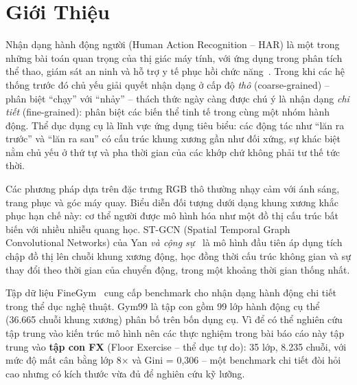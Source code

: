 \documentclass[conference]{IEEEtran}
\begin{document}
\section{Giới Thiệu}
\label{sec:intro}

Nhận dạng hành động người (Human Action Recognition -- HAR) là một trong
những bài toán quan trọng của thị giác máy tính, với ứng dụng trong phân
tích thể thao, giám sát an ninh và hỗ trợ y tế phục hồi chức
năng~\cite{yan2018stgcn}. Trong khi các hệ thống trước đó chủ yếu giải quyết
nhận dạng ở cấp độ \textit{thô} (coarse-grained) -- phân biệt ``chạy''
với ``nhảy'' -- thách thức ngày càng được chú ý là nhận dạng \textit{chi tiết} (fine-grained): phân biệt các biến thể tinh tế trong cùng một nhóm
hành động. Thể dục dụng cụ là lĩnh vực ứng dụng tiêu biểu: các động tác như
``lăn ra trước'' và ``lăn ra sau'' có cấu trúc khung xương gần như đối
xứng, sự khác biệt nằm chủ yếu ở thứ tự và pha thời gian của các khớp
chứ không phải tư thế tức thời.

Các phương pháp dựa trên đặc trưng RGB thô thường nhạy cảm với ánh sáng, trang phục
và góc máy quay. Biểu diễn đối tượng dưới dạng khung xương khắc phục hạn chế này: cơ thể
người được mô hình hóa như một đồ thị cấu trúc bất biến với nhiều nhiễu
quang học. ST-GCN (Spatial Temporal Graph Convolutional Networks) của Yan
\textit{và cộng sự}~\cite{yan2018stgcn} là mô hình đầu tiên áp dụng tích
chập đồ thị lên chuỗi khung xương động, học đồng thời cấu trúc không gian
và sự thay đổi theo thời gian của chuyển động, trong một khoảng thời gian thống nhất.

Tập dữ liệu FineGym~\cite{shao2020finegym} cung cấp benchmark cho nhận
dạng hành động chi tiết trong thể dục nghệ thuật. Gym99 là tập con gồm 99
lớp hành động cụ thể (36.665 chuỗi khung xương) phân bố trên bốn dụng
cụ. Vì để có thể nghiên cứu tập trung vào kiến trúc mô hình nên các thực nghiệm trong bài báo cáo này tập trung vào \textbf{tập con FX}
(Floor Exercise -- thể dục tự do): 35 lớp, 8.235 chuỗi, với mức độ mất
cân bằng lớp 8$\times$ và Gini = 0,306 -- một benchmark chi tiết đòi hỏi
cao nhưng có kích thước vừa đủ để nghiên cứu kỹ lưỡng.
\end{document}
